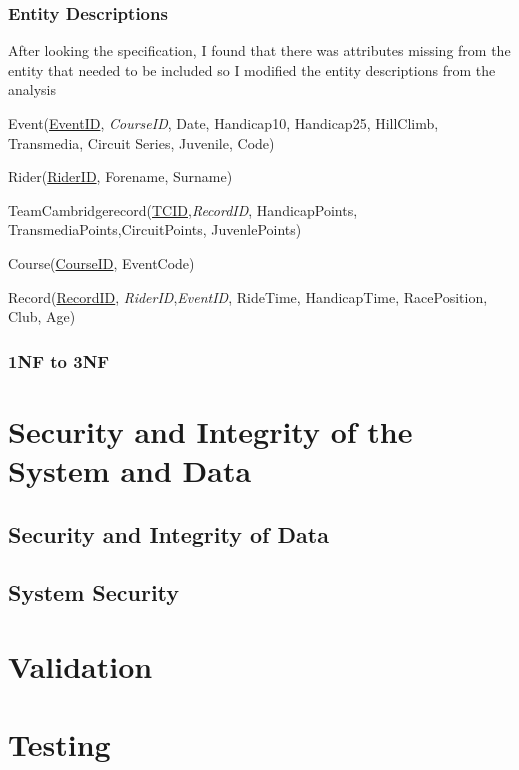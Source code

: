 \subsubsection{Entity Descriptions}
After looking the specification, I found that there was attributes missing from the entity that needed to be included so I modified the entity descriptions from the analysis

Event(\underline{EventID}, \emph{CourseID}, Date, Handicap10, Handicap25, HillClimb, Transmedia, Circuit Series, Juvenile, Code)

Rider(\underline{RiderID}, Forename, Surname)

TeamCambridgerecord(\underline{TCID},\emph{RecordID}, HandicapPoints, TransmediaPoints,CircuitPoints, JuvenlePoints)

Course(\underline{CourseID}, EventCode)

Record(\underline{RecordID}, \emph{RiderID},\emph{EventID}, RideTime, HandicapTime, RacePosition, Club, Age)

\subsubsection{1NF to 3NF}

\section{Security and Integrity of the System and Data}

\subsection{Security and Integrity of Data}

\subsection{System Security}

\section{Validation}

\section{Testing}

